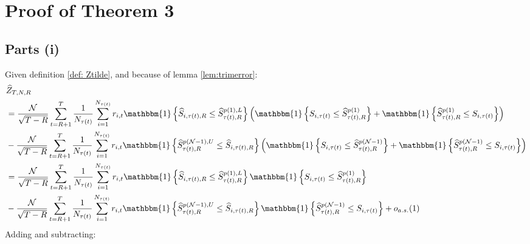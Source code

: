 
\section{Proof of Theorem 3}
\label{Proof of th:feasible}

\subsection{Parts (i)}

Given definition \ref{def: Ztilde}, and because of lemma \ref{lem:trimerror}:
\begin{align*}
&\widehat{Z}_{T,N,R} \\
&=\frac{\mathcal{N}}{\sqrt{T-R}}\sum_{t=R+1}^{T}\frac{1}{N_{\tau(t)}}\sum_{i=1}^{N_{\tau(t)}} r_{i,t} \mathbbm{1} \left\{ \widehat{S}_{i,\tau(t),R}\leq \widehat{S}_{\tau(t),R}^{p(1),L} \right\} \left( \mathbbm{1} \left\{ S_{i,\tau(t)} \leq \widehat{S}_{\tau(t),R}^{p(1)} \right\} +  \mathbbm{1} \left\{ \widehat{S}_{\tau(t),R}^{p(1)} \leq S_{i,\tau(t)} \right\} \right) \\
&- \frac{\mathcal{N}}{\sqrt{T-R}}\sum_{t=R+1}^{T}\frac{1}{N_{\tau(t)}}\sum_{i=1}^{N_{\tau(t)}} r_{i,t} \mathbbm{1}\left\{  \widehat{S}_{\tau(t),R}^{p(\mathcal{N}-1),U} \leq \widehat{S}_{i,\tau(t),R}\right\} \left( \mathbbm{1} \left\{ S_{i,\tau(t)} \leq  \widehat{S}_{\tau(t),R}^{p(\mathcal{N}-1)} \right\} + \mathbbm{1} \left\{ \widehat{S}_{\tau(t),R}^{p(\mathcal{N}-1)} \leq S_{i,\tau(t)} \right\} \right) \\
&=\frac{\mathcal{N}}{\sqrt{T-R}}\sum_{t=R+1}^{T}\frac{1}{N_{\tau(t)}}\sum_{i=1}^{N_{\tau(t)}} r_{i,t} \mathbbm{1} \left\{ \widehat{S}_{i,\tau(t),R}\leq \widehat{S}_{\tau(t),R}^{p(1),L} \right\} \mathbbm{1} \left\{ S_{i,\tau(t)} \leq \widehat{S}_{\tau(t),R}^{p(1)} \right\} \\
&- \frac{\mathcal{N}}{\sqrt{T-R}}\sum_{t=R+1}^{T}\frac{1}{N_{\tau(t)}}\sum_{i=1}^{N_{\tau(t)}} r_{i,t} \mathbbm{1}\left\{ \widehat{S}_{\tau(t),R}^{p(\mathcal{N}-1),U} \leq \widehat{S}_{i,\tau(t),R}\right\} \mathbbm{1} \left\{ \widehat{S}_{\tau(t),R}^{p(\mathcal{N}-1)} \leq S_{i,\tau(t)} \right\} + o_{a.s.}(1)
\end{align*}
Adding and subtracting:
